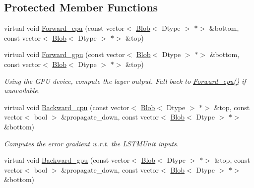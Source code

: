 \subsection*{Protected Member Functions}
\begin{DoxyCompactItemize}
\item 
virtual void \mbox{\hyperlink{classcaffe_1_1_l_s_t_m_unit_layer_ad44e302db28f57bfdfbbbde452deb4fd}{Forward\+\_\+cpu}} (const vector$<$ \mbox{\hyperlink{classcaffe_1_1_blob}{Blob}}$<$ Dtype $>$ $\ast$$>$ \&bottom, const vector$<$ \mbox{\hyperlink{classcaffe_1_1_blob}{Blob}}$<$ Dtype $>$ $\ast$$>$ \&top)
\item 
\mbox{\label{classcaffe_1_1_l_s_t_m_unit_layer_a20c18c7fe0a8a8fdd6cd700a420ecc1f}} 
virtual void \mbox{\hyperlink{classcaffe_1_1_l_s_t_m_unit_layer_a20c18c7fe0a8a8fdd6cd700a420ecc1f}{Forward\+\_\+gpu}} (const vector$<$ \mbox{\hyperlink{classcaffe_1_1_blob}{Blob}}$<$ Dtype $>$ $\ast$$>$ \&bottom, const vector$<$ \mbox{\hyperlink{classcaffe_1_1_blob}{Blob}}$<$ Dtype $>$ $\ast$$>$ \&top)
\begin{DoxyCompactList}\small\item\em Using the G\+PU device, compute the layer output. Fall back to \mbox{\hyperlink{classcaffe_1_1_l_s_t_m_unit_layer_ad44e302db28f57bfdfbbbde452deb4fd}{Forward\+\_\+cpu()}} if unavailable. \end{DoxyCompactList}\item 
virtual void \mbox{\hyperlink{classcaffe_1_1_l_s_t_m_unit_layer_aab97af46aeebdae3d7f7046aa6ba5f7f}{Backward\+\_\+cpu}} (const vector$<$ \mbox{\hyperlink{classcaffe_1_1_blob}{Blob}}$<$ Dtype $>$ $\ast$$>$ \&top, const vector$<$ bool $>$ \&propagate\+\_\+down, const vector$<$ \mbox{\hyperlink{classcaffe_1_1_blob}{Blob}}$<$ Dtype $>$ $\ast$$>$ \&bottom)
\begin{DoxyCompactList}\small\item\em Computes the error gradient w.\+r.\+t. the L\+S\+T\+M\+Unit inputs. \end{DoxyCompactList}\item 
\mbox{\label{classcaffe_1_1_l_s_t_m_unit_layer_ad89dd388a2e1067d654d866436508964}} 
virtual void \mbox{\hyperlink{classcaffe_1_1_l_s_t_m_unit_layer_ad89dd388a2e1067d654d866436508964}{Backward\+\_\+gpu}} (const vector$<$ \mbox{\hyperlink{classcaffe_1_1_blob}{Blob}}$<$ Dtype $>$ $\ast$$>$ \&top, const vector$<$ bool $>$ \&propagate\+\_\+down, const vector$<$ \mbox{\hyperlink{classcaffe_1_1_blob}{Blob}}$<$ Dtype $>$ $\ast$$>$ \&bottom)

\end{DoxyCompactItemize}
